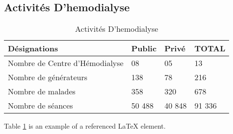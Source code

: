 \newpage
\subsection{Activités D’hemodialyse}

\begin{table}[h!]
\begin{center}
\begin{tabular}{|p{6cm}|p{2cm}|p{2cm}|p{2cm}|}
\hline
Désignations	                  &Public	        &Privé	        &TOTAL\\
\hline
Nombre de Centre d’Hémodialyse	&08	            &05	            &13\\
Nombre de générateurs	          &138	          &78	            &216\\
Nombre de malades	              &358	          &320	          &678\\
Nombre de séances	              &50 488	        &40 848	        &91 336\\
\hline
\end{tabular}
\end{center}
\caption{Activités D’hemodialyse}
\label{table:9}
\end{table}
Table \ref{table:9} is an example of a referenced \LaTeX{} element.




